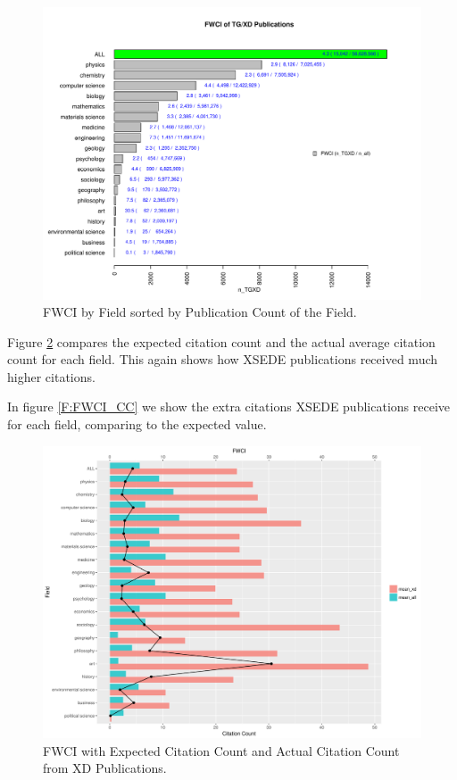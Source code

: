 \documentclass{sig-alternate}
\begin{document}
\begin{figure}[htb!]
    \includegraphics[width=0.95\columnwidth]{images/fwci_nxd.pdf}
    \caption{FWCI by Field sorted by Publication Count of the Field.}
    \label{F:fwci_nxd}
\end{figure}

Figure \ref{F:FWCIwCC} compares the expected citation count and the actual average
citation count for each field. This again shows how XSEDE publications received much
higher citations.

In figure \ref{F:FWCI_CC} we show the extra citations XSEDE publications receive for
each field, comparing to the expected value.

\begin{figure}[htb!]
    \includegraphics[width=0.95\columnwidth]{images/FWCIwCC.pdf}
    \caption{FWCI with Expected Citation Count and Actual Citation Count from XD Publications.}
    \label{F:FWCIwCC}
\end{figure}
\end{document}

